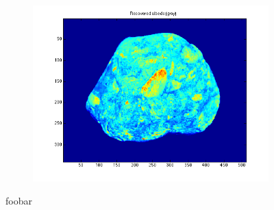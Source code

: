 \documentclass{paper}
\begin{document}
\begin{figure}[h!]
\begin{subfigure}{0.3\textwidth}
        \includegraphics[width=\textwidth]{results/rock/rock_rec_a}
    \end{subfigure}
    \caption{foobar}
    \label{fig:rec_albeldo}       
\end{figure}
\end{document}
